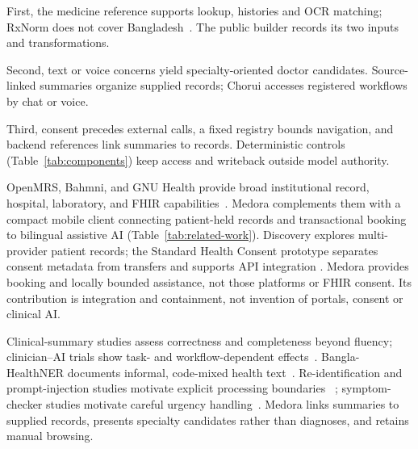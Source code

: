 \documentclass[preprint,12pt,a4paper]{elsarticle}
\begin{document}
First, the medicine reference supports lookup, histories and OCR matching; RxNorm does
not cover Bangladesh~\cite{rxnorm}. The public builder records its two inputs and transformations.


Second, text or voice concerns yield specialty-oriented doctor candidates. Source-linked
summaries organize supplied records; Chorui accesses registered workflows by chat or voice.

Third, consent precedes external calls, a fixed registry bounds navigation, and
backend references link summaries to records. Deterministic controls
(Table~\ref{tab:components}) keep access and writeback outside model authority.


OpenMRS, Bahmni, and GNU Health provide broad institutional record, hospital, laboratory,
and FHIR capabilities~\cite{openmrs,bahmni,gnuhealth}. Medora complements them with a
compact mobile client connecting patient-held records and transactional booking to
bilingual assistive AI (Table~\ref{tab:related-work}).
Discovery explores multi-provider patient records\cite{nakikj2023}; the Standard Health
Consent prototype separates consent metadata from transfers and supports API integration
\cite{brueckner2025}. Medora provides booking and locally bounded assistance, not those
platforms or FHIR consent. Its contribution is integration and containment, not invention
of portals, consent or clinical AI.

Clinical-summary studies assess correctness and completeness beyond fluency; clinician--AI
trials show task- and workflow-dependent effects~\cite{shing2021,tracsum,zhang2024clinicalsummary,goh2025gpt4assistance}.
Bangla-HealthNER documents informal, code-mixed health text~\cite{khan2023banglahealthner}.
Re-identification and prompt-injection studies motivate explicit processing boundaries
~\cite{campion2025diri,yang2025adversarial}; symptom-checker studies motivate careful urgency
handling~\cite{wallace2022}. Medora links summaries to supplied records, presents specialty
candidates rather than diagnoses, and retains manual browsing.
\end{document}
